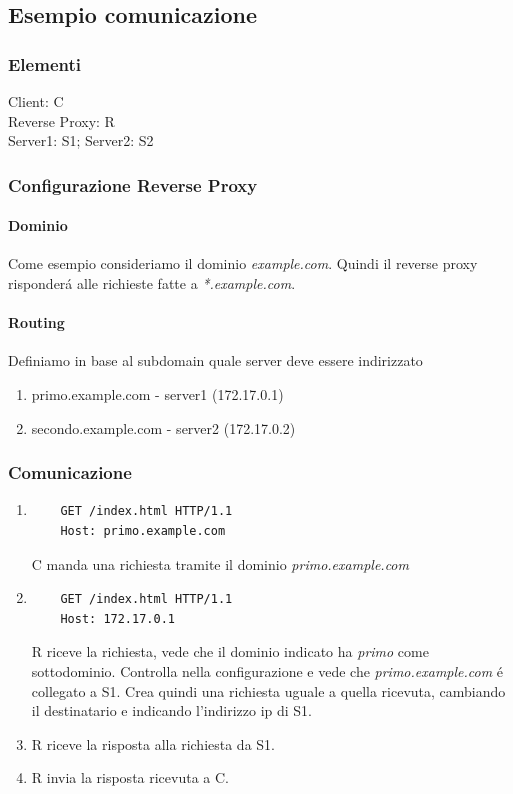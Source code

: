 \subsection{Esempio comunicazione}
\subsubsection{Elementi}
Client: C\\ Reverse Proxy: R\\ Server1: S1; Server2: S2
\subsubsection{Configurazione Reverse Proxy}
\paragraph{Dominio} Come esempio consideriamo il dominio \textit{example.com}. Quindi il reverse proxy risponderá alle richieste fatte a \textit{*.example.com}.
\paragraph{Routing} Definiamo in base al subdomain quale server deve essere indirizzato
\begin{enumerate}
  \item primo.example.com - server1 (172.17.0.1)
  \item secondo.example.com - server2 (172.17.0.2)
\end{enumerate}
\subsubsection{Comunicazione}
\begin{enumerate}
  \item
  \begin{verbatim}
    GET /index.html HTTP/1.1
    Host: primo.example.com
  \end{verbatim}
    C manda una richiesta tramite il dominio \textit{primo.example.com}
  \item
    \begin{verbatim}
    GET /index.html HTTP/1.1
    Host: 172.17.0.1
    \end{verbatim}
    R riceve la richiesta, vede che il dominio indicato ha \textit{primo} come sottodominio. Controlla nella configurazione e vede che \textit{primo.example.com} é collegato a S1. Crea quindi una richiesta uguale a quella ricevuta, cambiando il destinatario e indicando l'indirizzo ip di S1.
  \item R riceve la risposta alla richiesta da S1.
  \item R invia la risposta ricevuta a C.
\end{enumerate}


